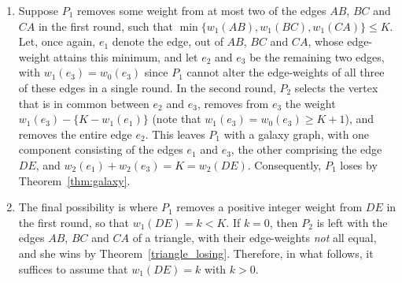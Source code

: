 \documentclass[11pt,reqno]{amsart}
\theoremstyle{definition}
\theoremstyle{definition}
\begin{document}
\begin{enumerate}
\item Suppose $P_{1}$ removes some weight from at most two of the edges $AB$, $BC$ and $CA$ in the first round, such that $\min\{w_{1}(AB),w_{1}(BC),w_{1}(CA)\}\leqslant K$. Let, once again, $e_{1}$ denote the edge, out of $AB$, $BC$ and $CA$, whose edge-weight attains this minimum, and let $e_{2}$ and $e_{3}$ be the remaining two edges, with $w_{1}(e_{3})=w_{0}(e_{3})$ since $P_{1}$ cannot alter the edge-weights of all three of these edges in a single round. In the second round, $P_{2}$ selects the vertex that is in common between $e_{2}$ and $e_{3}$, removes from $e_{3}$ the weight $w_{1}(e_{3})-\{K-w_{1}(e_{1})\}$ (note that $w_{1}(e_{3})=w_{0}(e_{3}) \geqslant K+1$), and removes the entire edge $e_{2}$. This leaves $P_{1}$ with a galaxy graph, with one component consisting of the edges $e_{1}$ and $e_{3}$, the other comprising the edge $DE$, and $w_{2}(e_{1})+w_{2}(e_{3})=K=w_{2}(DE)$. Consequently, $P_{1}$ loses by Theorem~\ref{thm:galaxy}.

\item The final possibility is where $P_{1}$ removes a positive integer weight from $DE$ in the first round, so that $w_{1}(DE)=k < K$. If $k=0$, then $P_{2}$ is left with the edges $AB$, $BC$ and $CA$ of a triangle, with their edge-weights \emph{not} all equal, and she wins by Theorem~\ref{triangle_losing}. Therefore, in what follows, it suffices to assume that $w_{1}(DE)=k$ with $k > 0$.


\end{enumerate}
\end{document}
